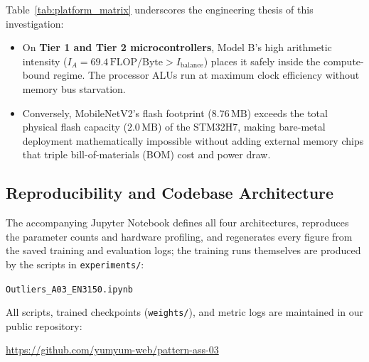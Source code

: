 \documentclass[11pt,a4paper]{article}
\begin{document}
Table~\ref{tab:platform_matrix} underscores the engineering thesis of this investigation:
\begin{itemize}[leftmargin=*,itemsep=2pt]
  \item On \textbf{Tier 1 and Tier 2 microcontrollers}, Model B's high arithmetic intensity ($I_A = 69.4\,\text{FLOP/Byte} > I_{\text{balance}}$) places it safely inside the compute-bound regime. The processor ALUs run at maximum clock efficiency without memory bus starvation.
  \item Conversely, MobileNetV2's flash footprint ($8.76\,\text{MB}$) exceeds the total physical flash capacity ($2.0\,\text{MB}$) of the STM32H7, making bare-metal deployment mathematically impossible without adding external memory chips that triple bill-of-materials (BOM) cost and power draw.
\end{itemize}

\subsection{Reproducibility and Codebase Architecture}
The accompanying Jupyter Notebook defines all four architectures, reproduces the parameter counts and hardware profiling, and regenerates every figure from the saved training and evaluation logs; the training runs themselves are produced by the scripts in \texttt{experiments/}:
\begin{center}
  \texttt{Outliers\_A03\_EN3150.ipynb}
\end{center}
All scripts, trained checkpoints (\texttt{weights/}), and metric logs are maintained in our public repository:
\begin{center}
  \url{https://github.com/yumyum-web/pattern-ass-03}
\end{center}
\end{document}
